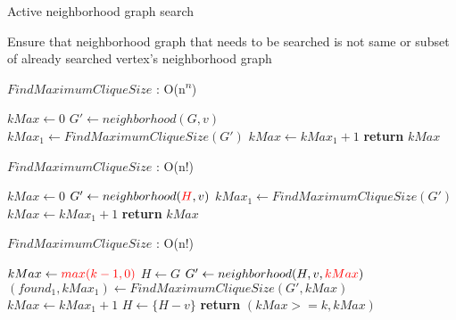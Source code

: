 \documentclass[landscape]{slides}
\begin{document}
\begin{slide}
	\begin{center}
		{\large Active neighborhood graph search }
	\end{center}

	{\large Ensure that neighborhood graph that needs to be searched is not same or subset of already searched vertex's neighborhood graph}
\end{slide}


\begin{algorithm}
	\caption{$FindMaximumCliqueSize$ : O(n\textsuperscript{$n$})}
	\begin{algorithmic}[1]
		\State $kMax \gets 0$
			\State $G' \gets neighborhood(G, v)$
			\State $kMax_1 \gets FindMaximumCliqueSize(G')$
				\State $kMax \gets kMax_1 + 1$
			\EndIf
		\EndFor
		\State \textbf{return} $kMax$
	\EndFunction
	\end{algorithmic}
\end{algorithm}

\begin{algorithm}
	\caption{$FindMaximumCliqueSize$ : O(n!)}
	\begin{algorithmic}[1]
		\State $kMax \gets 0$
			\State $G' \gets neighborhood({\color{red} H}, v)$
			\State $kMax_1 \gets FindMaximumCliqueSize(G')$
				\State $kMax \gets kMax_1 + 1$
			\EndIf
		\EndFor
		\State \textbf{return} $kMax$
		\EndFunction
	\end{algorithmic}
\end{algorithm}

\begin{algorithm}
	\caption{$FindMaximumCliqueSize$ : O(n!)}
	\begin{algorithmic}[1]
		\State $kMax \gets {\color{red}max(k - 1, 0)}$
		\State $H \gets G$
			\State $G' \gets neighborhood(H, v, {\color{red}kMax})$
			{\color{red} 
				\State $(found_1, kMax_1) \gets FindMaximumCliqueSize(G', kMax)$
					\State $kMax \gets kMax_1 + 1$
				\EndIf
			\EndIf }
			\State $H \gets \{H - v\}$
		\EndFor
		\State \textbf{return} {\color{red} $(kMax >= k, kMax)$ }
		\EndFunction
	\end{algorithmic}
\end{algorithm}
\end{document}
